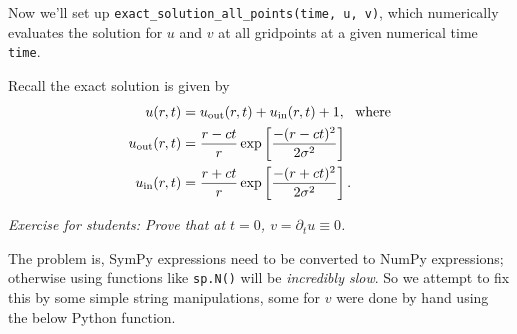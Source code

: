 \documentclass[landscape,letterpaper,10pt,english]{article}
\begin{document}
\[\label{numpy_id}\]

Now we'll set up \texttt{exact\_solution\_all\_points(time,\ u,\ v)},
which numerically evaluates the solution for \(u\) and \(v\) at all
gridpoints at a given numerical time \texttt{time}.

Recall the exact solution is given by \begin{align}
u(r,t) &= u_{\rm out}(r,t) + u_{\rm in}(r,t) + 1,\ \ \text{where}\\
u_{\rm out}(r,t) &=\frac{r-ct}{r} \exp\left[\frac{-(r-ct)^2}{2 \sigma^2}\right] \\
u_{\rm in}(r,t) &=\frac{r+ct}{r} \exp\left[\frac{-(r+ct)^2}{2 \sigma^2}\right].
\end{align}

\emph{Exercise for students: Prove that at \(t=0\),
\(v=\partial_t u \equiv 0\).}

The problem is, SymPy expressions need to be converted to NumPy
expressions; otherwise using functions like \texttt{sp.N()} will be
\emph{incredibly slow}. So we attempt to fix this by some simple string
manipulations, some for \(v\) were done by hand using the below Python
function.
\end{document}
